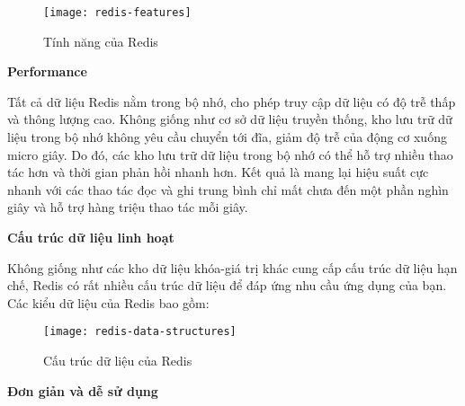 \begin{figure}[H]
	\centering
	\texttt{[image: redis-features]}
	\caption{Tính năng của Redis}
\end{figure}

\textbf{Performance}

Tất cả dữ liệu Redis nằm trong bộ nhớ, cho phép truy cập dữ liệu có độ trễ thấp và thông lượng cao. Không giống như cơ sở dữ liệu truyền thống, kho lưu trữ dữ liệu trong bộ nhớ không yêu cầu chuyển tới đĩa, giảm độ trễ của động cơ xuống micro giây. Do đó, các kho lưu trữ dữ liệu trong bộ nhớ có thể hỗ trợ nhiều thao tác hơn và thời gian phản hồi nhanh hơn. Kết quả là mang lại hiệu suất cực nhanh với các thao tác đọc và ghi trung bình chỉ mất chưa đến một phần nghìn giây và hỗ trợ hàng triệu thao tác mỗi giây.

\textbf{Cấu trúc dữ liệu linh hoạt}

Không giống như các kho dữ liệu khóa-giá trị khác cung cấp cấu trúc dữ liệu hạn chế, Redis có rất nhiều cấu trúc dữ liệu để đáp ứng nhu cầu ứng dụng của bạn. Các kiểu dữ liệu của Redis bao gồm:

\begin{figure}[H]
	\centering
	\texttt{[image: redis-data-structures]}
	\caption{Cấu trúc dữ liệu của Redis}
\end{figure}

\begin{itemize}
\end{itemize}

\textbf{Đơn giản và dễ sử dụng}

